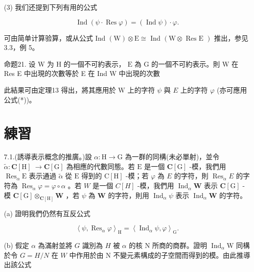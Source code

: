 \documentclass[10pt]{article}
\begin{document}
(3) 我们还提到下列有用的公式

\[
\operatorname{Ind}\left( {\psi  \cdot  \operatorname{Res}\varphi }\right)  = \left( {\operatorname{Ind}\psi }\right)  \cdot  \varphi .
\]

可由简单计算验算，或从公式 Ind \(\left( \mathrm{W}\right)  \otimes  \mathrm{E} \cong\) Ind \(\left( {\mathrm{W} \otimes  \text{ Res E }}\right)\) 推出，参见 3.3，例 5。

命题21. 设 \(\mathrm{W}\) 为 \(\mathrm{H}\) 的一個不可約表示， \(\mathrm{E}\) 為 \(\mathrm{G}\) 的一個不可約表示。則 \(\mathrm{W}\) 在 Res E 中出現的次數等於 E 在 Ind W 中出現的次數

此結果可由定理13 得出，將其應用於 \(\mathrm{W}\) 上的字符 \(\psi\) 與 \(E\) 上的字符 \(\varphi\) (亦可應用公式(*))。

\section*{練習}

7.1.(誘導表示概念的推廣。)設 \(\alpha  : \mathrm{H} \rightarrow  \mathrm{G}\) 為一群的同構(未必單射)，並令 \(\widetilde{\alpha } : \mathbf{C}\left\lbrack  \mathrm{H}\right\rbrack \; \rightarrow  \mathbf{C}\left\lbrack  \mathrm{G}\right\rbrack\) 為相應的代數同態。若 \(\mathrm{E}\) 是一個 \(\mathbf{C}\left\lbrack  \mathrm{G}\right\rbrack\) -模，我們用 \({\operatorname{Res}}_{\alpha }\mathrm{E}\) 表示通過 \(\widetilde{\alpha }\) 從 \(\mathrm{E}\) 得到的 \(\mathrm{C}\left\lbrack  \mathrm{H}\right\rbrack\) -模；若 \(\varphi\) 為 \(E\) 的字符，則 \({\operatorname{Res}}_{\alpha }E\) 的字符為 \({\operatorname{Res}}_{\alpha }\varphi  = \varphi  \circ  \alpha\) 。若 \(W\) 是一個 \(C\left\lbrack  H\right\rbrack\) -模，我們用 \({\operatorname{Ind}}_{\alpha }\mathbf{W}\) 表示 \(\mathbf{C}\left\lbrack  \mathrm{G}\right\rbrack\) -模 \(\mathbf{C}\left\lbrack  \mathrm{G}\right\rbrack  { \otimes  }_{\mathbf{C}\left\lbrack  \mathrm{H}\right\rbrack  }\mathbf{W}\) ，若 \(\psi\) 為 \(\mathbf{W}\) 的字符，則用 \({\operatorname{Ind}}_{\alpha }\psi\) 表示 \({\operatorname{Ind}}_{\alpha }\mathbf{W}\) 的字符。

(a) 證明我們仍然有互反公式

\[
{\left\langle  \psi ,{\operatorname{Res}}_{\alpha }\varphi \right\rangle  }_{\mathrm{H}} = {\left\langle  {\operatorname{Ind}}_{\alpha }\psi ,\varphi \right\rangle  }_{\mathrm{G}}.
\]

(b) 假定 \(\alpha\) 為滿射並將 \(G\) 識別為 \(H\) 被 \(\alpha\) 的核 \(\mathrm{N}\) 所商的商群。證明 \({\operatorname{Ind}}_{\alpha }\mathrm{W}\) 同構於令 \(G = H/N\) 在 \(W\) 中作用於由 \(\mathrm{N}\) 不變元素構成的子空間而得到的模。由此推導出該公式
\end{document}
